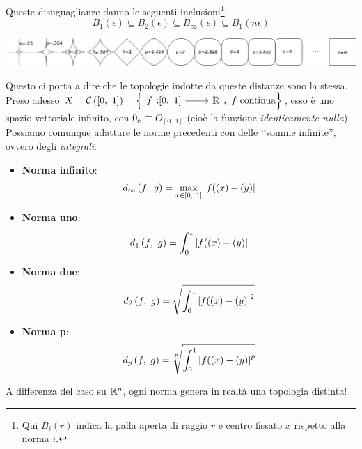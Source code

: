 Queste disuguaglianze danno le seguenti inclusioni\footnote{Qui $B_i\left(r\right)$ indica la palla aperta di raggio $r$ e centro fissato $x$ rispetto alla norma $i$.}:
\begin{equation}
B_1\left(\epsilon\right)\subseteq B_2\left(\epsilon\right)\subseteq B_\infty\left(\epsilon\right)\subseteq B_1\left(n\epsilon\right)
\end{equation}
\begin{center}
	\hspace*{-12cm}\begin{minipage}{.2\linewidth}
		\includegraphics[trim=18.1cm 0cm 0cm 0cm,clip,scale=0.37]{images/pnorm.png}
	\end{minipage}
\end{center}
Questo ci porta a dire che le topologie indotte da queste distanze sono la stessa.\\
Preso adesso $X=\mathcal{C}\left([0,\ 1]\right)=\left\{\funz{f}{[0,\ 1]}{\realset},\ f\text{ continua}\right\}$, esso è uno spazio vettoriale infinito, con $0_\mathcal{C}\equiv O_{[0,\ 1]}$ (cioè la funzione \textit{identicamente nulla}). Possiamo comunque adattare le norme precedenti con delle ‘‘somme infinite'', ovvero degli \textit{integrali}.
\vspace{-2mm}
\begin{multicols}{2}
	\begin{itemize}
		\item \textbf{Norma infinito}:
		\[\displaystyle\mvf{d_\infty}{f}{g}=\max_{x\in[0,\ 1]}{\left|f(\left(x\right)-\left(y\right)\right|}\]
		\item \textbf{Norma uno}: \[\displaystyle d_1\left(f,\ g\right)=\int_{0}^{1}\left|f(\left(x\right)-\left(y\right)\right|\]
	\end{itemize}
	\begin{itemize}
		\item \textbf{Norma due}: \[\displaystyle d_2\left(f,\ g\right)=\sqrt{\int_{0}^{1}\left|f(\left(x\right)-\left(y\right)\right|^2}\]
		\item \textbf{Norma p}: \[\displaystyle\mvf{d_p}{f}{g}=\sqrt[\leftroot{1}\uproot{3}p]{\int_{0}^{1}\left|f(\left(x\right)-\left(y\right)\right|^p}\]
	\end{itemize}
\end{multicols}
\vspace{-1mm}
\noindent A differenza del caso su $\mathbb{R}^n$, ogni norma genera in realtà una topologia distinta!
\vspace{-3mm}
